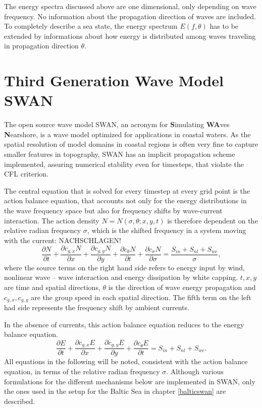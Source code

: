 The energy spectra discussed above are one dimensional, only depending on wave 
frequency. No information about the propagation direction of waves are 
included. To completely describe a sea state, the energy spectrum $E(f,\theta)$ 
has to be extended by informations about how energy is distributed among waves 
traveling in propagation direction $\theta$.

\section{Third Generation Wave Model SWAN}

The open source wave model SWAN, an acronym for \textbf{S}imulating 
\textbf{WA}ves \textbf{N}earshore, is a wave model optimized for applications in 
coastal waters. As the spatial resolution of model domains in coastal regions is 
often very fine to capture smaller features in topography, SWAN has an implicit 
propagation scheme implemented, assuring numerical stability even for timesteps, 
that violate the CFL criterion. 

The central equation that is solved for every timestep at every grid point is 
the action balance equation, that accounts not only for the energy 
distributions 
in the wave frequency space but also for frequency shifts by wave-current 
interaction. The action density $N=N(\sigma,\theta; x,y,t)$ is therefore 
dependent on the relative radian frequency $\sigma$, which is the shifted 
frequency in a system moving with the current: NACHSCHLAGEN!
\begin{equation}\label{ebe}
 \frac{\partial N}{\partial t} + \frac{\partial c_{g,x} N}{\partial x} + \frac{ 
\partial c_{g,y} N}{\partial y} + \frac{\partial c_{\theta} N}{\partial t} + 
\frac{\partial c_{\sigma} N}{\partial \sigma}= \frac{S_{in} + S_{nl} + 
S_{wc}}{\sigma},
\end{equation}
where the source terms on the right hand side refers to energy input by wind, 
nonlinear wave -- wave interaction and energy dissipation by white capping. $t, 
x ,y$ are time and spatial directions, $\theta$ is the direction of wave energy 
propagation and $c_{g,x}, c_{g,y}$ are the group speed in each spatial 
direction. The fifth term on the left had side represents the frequency shift 
by 
ambient currents.

In the absence of currents, this action balance equation reduces to the energy 
balance equation.
\begin{equation}\label{ebe}
 \frac{\partial E}{\partial t} + \frac{\partial c_{g,x} E}{\partial x} + \frac{ 
\partial c_{g,y} E}{\partial y} + \frac{\partial c_{\theta} E}{\partial t} = 
S_{in} + S_{nl} + S_{wc}.
\end{equation}
All equations in the following will be noted, consistent with the action balance 
equation, in terms of the relative radian frequency $\sigma$. Although various 
formulations for the different mechanisms below are implemented in SWAN, only 
the ones used in the setup for the Baltic Sea in chapter \ref{balticswan} are 
described.

